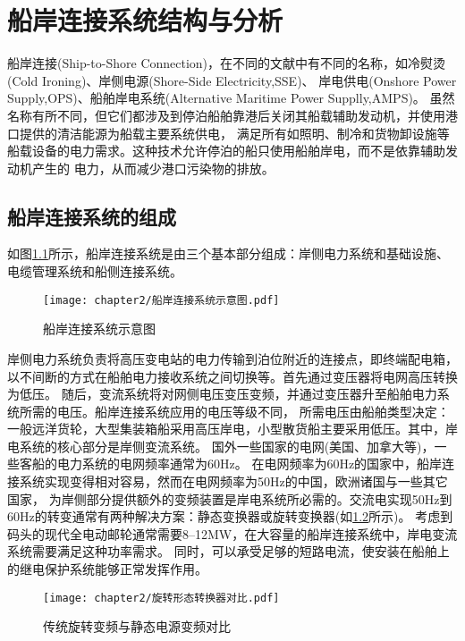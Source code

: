 \chapter{船岸连接系统结构与分析}

船岸连接(Ship-to-Shore Connection)，在不同的文献中有不同的名称，如冷熨烫(Cold Ironing)、岸侧电源(Shore-Side Electricity,SSE)、
岸电供电(Onshore Power Supply,OPS)、船舶岸电系统(Alternative Maritime Power Supplly,AMPS)。
虽然名称有所不同，但它们都涉及到停泊船舶靠港后关闭其船载辅助发动机，并使用港口提供的清洁能源为船载主要系统供电，
满足所有如照明、制冷和货物卸设施等船载设备的电力需求。这种技术允许停泊的船只使用船舶岸电，而不是依靠辅助发动机产生的
电力，从而减少港口污染物的排放。

\section{船岸连接系统的组成}

如图\ref{fig:船岸连接系统示意图}所示，船岸连接系统是由三个基本部分组成：岸侧电力系统和基础设施、电缆管理系统和船侧连接系统。

\begin{figure}[!htp]
	\centering
	\texttt{[image: chapter2/船岸连接系统示意图.pdf]}
	\caption{船岸连接系统示意图}
	\label{fig:船岸连接系统示意图}
\end{figure}

岸侧电力系统负责将高压变电站的电力传输到泊位附近的连接点，即终端配电箱，以不间断的方式在船舶电力接收系统之间切换等。首先通过变压器将电网高压转换为低压。
随后，变流系统将对网侧电压变压变频，并通过变压器升至船舶电力系统所需的电压。船岸连接系统应用的电压等级不同，
所需电压由船舶类型决定：一般远洋货轮，大型集装箱船采用高压岸电，小型散货船主要采用低压。其中，岸电系统的核心部分是岸侧变流系统。
国外一些国家的电网(美国、加拿大等)，一些客船的电力系统的电网频率通常为60Hz。
在电网频率为60Hz的国家中，船岸连接系统实现变得相对容易，然而在电网频率为50Hz的中国，欧洲诸国与一些其它国家，
为岸侧部分提供额外的变频装置是岸电系统所必需的。交流电实现50Hz到60Hz的转变通常有两种解决方案：静态变换器或旋转变换器(如\ref{fig:传统旋转变频与静态电源变频对比}所示)。
考虑到码头的现代全电动邮轮通常需要8–12\si{MW}\cite{SP15}，在大容量的船岸连接系统中，岸电变流系统需要满足这种功率需求。
同时，可以承受足够的短路电流，使安装在船舶上的继电保护系统能够正常发挥作用。

\begin{figure}[!htp]
	\centering
	\texttt{[image: chapter2/旋转形态转换器对比.pdf]}
	\caption{传统旋转变频与静态电源变频对比}
	\label{fig:传统旋转变频与静态电源变频对比}
\end{figure}

